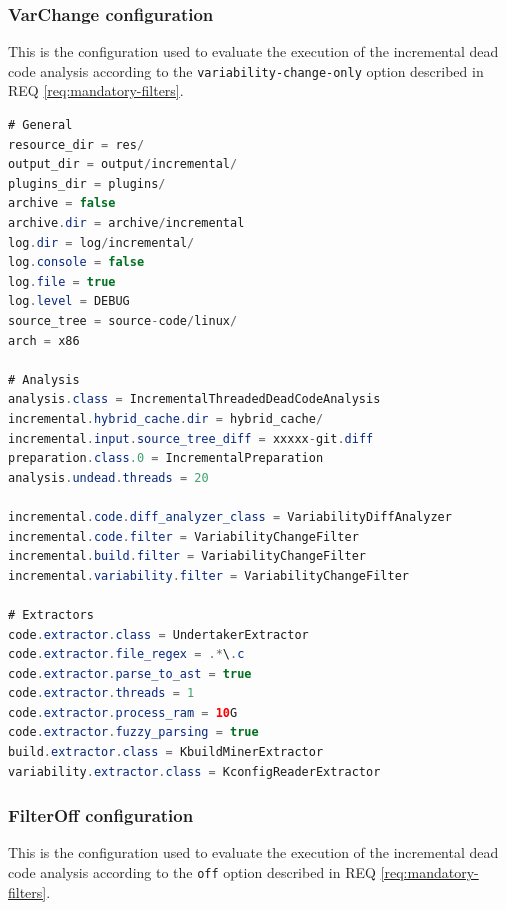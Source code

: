 \documentclass[a4paper]{article}
\begin{document}
\clearpage

\subsubsection{VarChange configuration}

This is the configuration used to evaluate the execution of the incremental dead code analysis according to the \texttt{variability-change-only} option described in  REQ \ref{req:mandatory-filters}.

\begin{lstlisting}[language=java]
# General
resource_dir = res/
output_dir = output/incremental/
plugins_dir = plugins/
archive = false
archive.dir = archive/incremental
log.dir = log/incremental/
log.console = false
log.file = true
log.level = DEBUG
source_tree = source-code/linux/
arch = x86

# Analysis  
analysis.class = IncrementalThreadedDeadCodeAnalysis
incremental.hybrid_cache.dir = hybrid_cache/
incremental.input.source_tree_diff = xxxxx-git.diff
preparation.class.0 = IncrementalPreparation
analysis.undead.threads = 20

incremental.code.diff_analyzer_class = VariabilityDiffAnalyzer
incremental.code.filter = VariabilityChangeFilter
incremental.build.filter = VariabilityChangeFilter
incremental.variability.filter = VariabilityChangeFilter

# Extractors  
code.extractor.class = UndertakerExtractor
code.extractor.file_regex = .*\.c
code.extractor.parse_to_ast = true
code.extractor.threads = 1
code.extractor.process_ram = 10G
code.extractor.fuzzy_parsing = true
build.extractor.class = KbuildMinerExtractor
variability.extractor.class = KconfigReaderExtractor
\end{lstlisting}

\clearpage

\subsubsection{FilterOff configuration}

This is the configuration used to evaluate the execution of the incremental dead code analysis according to the \texttt{off} option described in  REQ \ref{req:mandatory-filters}.
\end{document}
